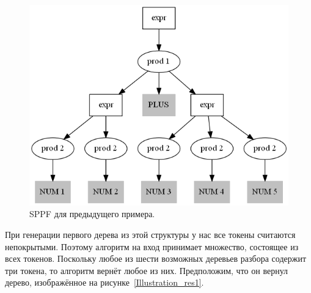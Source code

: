 \begin{figure}[t]
\centering
\includegraphics[height=\linewidth]{Ivanov/Pictures/Illustration_sppf.png}
\caption{SPPF для предыдущего примера.}
\label{illustration_sppf}
\end{figure}

При генерации первого дерева из этой структуры у нас все токены считаются непокрытыми. Поэтому алгоритм на вход принимает множество, состоящее из всех токенов. Поскольку любое из шести возможных деревьев разбора содержит три токена, то алгоритм вернёт любое из них. Предположим, что он вернул дерево, изображённое на рисунке~\ref{Illustration_res1}. 

